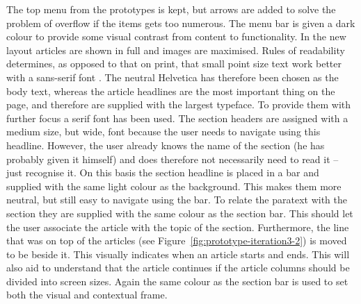 \begin{figure}
{}
\end{figure}

The top menu from the prototypes is kept, but arrows are added to solve the problem of overflow if the items gets too numerous. The menu bar is given a dark colour to provide some visual contrast from content to functionality. In the new layout articles are shown in full and images are maximised. Rules of readability determines, as opposed to that on print, that small point size text work better with a sans-serif font \cite{Tidwell}. The neutral Helvetica has therefore been chosen as the body text, whereas the article headlines are the most important thing on the page, and therefore are supplied with the largest typeface. To provide them with further focus a serif font has been used. The section headers are assigned with a medium size, but wide, font because the user needs to navigate using this headline. However, the user already knows the name of the section (he has probably given it himself) and does therefore not necessarily need to read it -- just recognise it. On this basis the section headline is placed in a bar and supplied with the same light colour as the background. This makes them more neutral, but still easy to navigate using the bar. To relate the paratext with the section they are supplied with the same colour as the section bar. This should let the user associate the article with the topic of the section. Furthermore, the line that was on top of the articles (see Figure~\ref{fig:prototype-iteration3-2}) is moved to be beside it. This visually indicates when an article starts and ends. This will also aid to understand that the article continues if the article columns should be divided into screen sizes. Again the same colour as the section bar is used to set both the visual and contextual frame.

